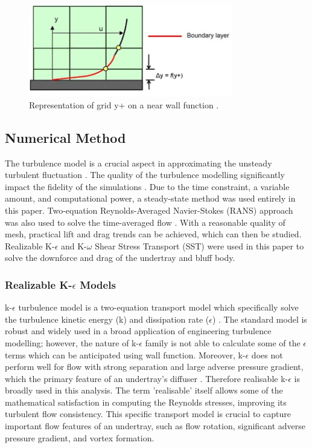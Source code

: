\begin{figure}[!ht]
    \centering
    \includegraphics[height=4cm]{Figures/inflation_layer.jpg}
    \caption{Representation of grid y+ on a near wall function \cite{Anonymous2013Inflate4Blog}.}
    \label{fig:inflation layer}
\end{figure}


\subsection{Numerical Method}
\noindent The turbulence model is a crucial aspect in approximating the unsteady turbulent fluctuation \cite{Cummings2015AppliedAerodynamics}. The quality of the turbulence modelling significantly impact the fidelity of the simulations \cite{Lanfrit2005BestFLUENT}. Due to the time constraint, a variable amount, and computational power, a steady-state method was used entirely in this paper. Two-equation Reynolds-Averaged Navier-Stokes (RANS) approach was also used to solve the time-averaged flow \cite{Cummings2015AppliedAerodynamics}. With a reasonable quality of mesh, practical lift and drag trends can be achieved, which can then be studied. Realizable K-$\epsilon$ and K-$\omega$ Shear Stress Transport (SST) were used in this paper to solve the downforce and drag of the undertray and bluff body.  

\subsubsection{Realizable K-$\epsilon$  Models}
k-$\epsilon$  turbulence model is a  two-equation transport model which specifically solve the turbulence kinetic energy (k) and dissipation rate ($\epsilon$) \cite{Andersson2011Turbulent-flowModelling}\cite{Mansour1989Near-wallModeling}\cite{Ansys2006ModelingFlows}. The standard model is robust and widely used in a broad application of engineering turbulence modelling; however, the nature of  k-$\epsilon$ family is not able to calculate some of the $\epsilon$ terms which can be anticipated using wall function. Moreover, k-$\epsilon$ does not perform well for flow with strong separation and large adverse pressure gradient, which the primary feature of an undertray's diffuser \cite{Ansys2006ModelingFlows}.  Therefore realisable k-$\epsilon$ is broadly used in this analysis. The term 'realisable' itself allows some of the mathematical satisfaction in computing the Reynolds stresses, improving its turbulent flow consistency. This specific transport model is crucial to capture important flow features of an undertray, such as flow rotation, significant adverse pressure gradient, and vortex formation.

